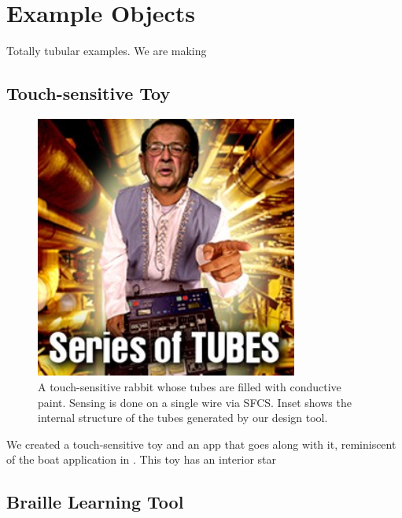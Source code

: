\section{Example Objects}

Totally tubular examples.  We are making

\subsection{Touch-sensitive Toy}

\begin{figure}[h]
\centering
    \includegraphics[width=3.4in]{figures/series-of-tubes.jpg}
\caption{A touch-sensitive rabbit whose tubes are filled with conductive paint.  Sensing is done on a single wire via SFCS.  Inset shows the internal structure of the tubes generated by our design tool.}
\label{fig:toy}
\end{figure}

We created a touch-sensitive toy and an app that goes along with it, reminiscent of the boat application in \cite{Harrison-acoustic}.  This toy has an interior star

\subsection{Braille Learning Tool}

